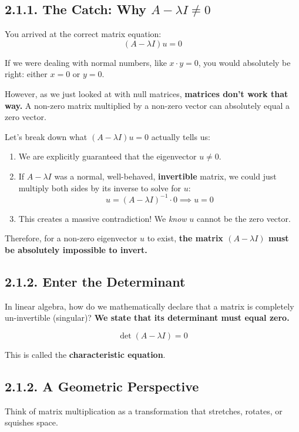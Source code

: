 \documentclass{article}
\begin{document}
\subsection*{2.1.1. The Catch: Why $A - \lambda I \neq 0$}

You arrived at the correct matrix equation:
\[ (A - \lambda I)u = 0 \]

If we were dealing with normal numbers, like $x \cdot y = 0$, you would absolutely be right: either $x=0$ or $y=0$. 

However, as we just looked at with null matrices, \textbf{matrices don't work that way.} A non-zero matrix multiplied by a non-zero vector can absolutely equal a zero vector. 

Let's break down what $(A - \lambda I)u = 0$ actually tells us:
\begin{enumerate}
    \item We are explicitly guaranteed that the eigenvector \textbf{$u \neq 0$}. 
    \item If $A - \lambda I$ was a normal, well-behaved, \textbf{invertible} matrix, we could just multiply both sides by its inverse to solve for $u$:
    \[ u = (A - \lambda I)^{-1} \cdot 0 \implies u = 0 \]
    \item This creates a massive contradiction! We \textit{know} $u$ cannot be the zero vector. 
\end{enumerate}

Therefore, for a non-zero eigenvector $u$ to exist, \textbf{the matrix $(A - \lambda I)$ must be absolutely impossible to invert.}

\subsection*{2.1.2. Enter the Determinant}

In linear algebra, how do we mathematically declare that a matrix is completely un-invertible (singular)? \textbf{We state that its determinant must equal zero.}

\[ \det(A - \lambda I) = 0 \]

This is called the \textbf{characteristic equation}. 

\subsection*{2.1.2. A Geometric Perspective}
Think of matrix multiplication as a transformation that stretches, rotates, or squishes space. 
\end{document}
